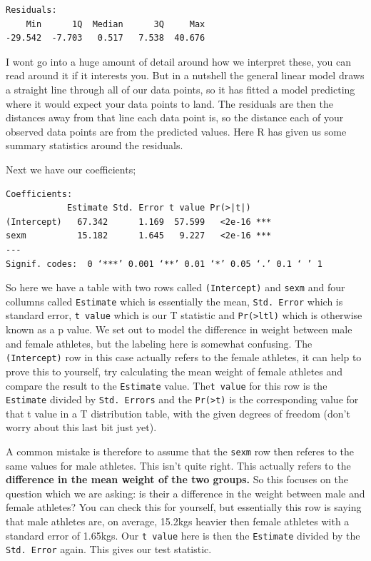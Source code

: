 \documentclass[
]{book}
\begin{document}
\begin{verbatim}
Residuals:
    Min      1Q  Median      3Q     Max 
-29.542  -7.703   0.517   7.538  40.676 
\end{verbatim}

I wont go into a huge amount of detail around how we interpret these, you can read around it if it interests you. But in a nutshell the general linear model draws a straight line through all of our data points, so it has fitted a model predicting where it would expect your data points to land. The residuals are then the distances away from that line each data point is, so the distance each of your observed data points are
from the predicted values. Here R has given us some summary statistics around the residuals.

Next we have our coefficients;

\begin{verbatim}
Coefficients:
            Estimate Std. Error t value Pr(>|t|)    
(Intercept)   67.342      1.169  57.599   <2e-16 ***
sexm          15.182      1.645   9.227   <2e-16 ***
---
Signif. codes:  0 ‘***’ 0.001 ‘**’ 0.01 ‘*’ 0.05 ‘.’ 0.1 ‘ ’ 1
\end{verbatim}

So here we have a table with two rows called \texttt{(Intercept)} and \texttt{sexm} and four collumns called \texttt{Estimate} which is essentially the mean, \texttt{Std.\ Error} which is standard error, \texttt{t\ value} which is our T statistic and \texttt{Pr(\textgreater{}ltl)} which is otherwise known as a p value. We set out to model the difference in weight between male and female athletes, but the labeling here is somewhat confusing. The \texttt{(Intercept)} row in this case actually refers to the female athletes, it can help to prove this to yourself, try calculating the mean weight of female athletes and compare the result to the \texttt{Estimate} value. The\texttt{t\ value} for this row is the \texttt{Estimate} divided by \texttt{Std.\ Errors} and the \texttt{Pr(\textgreater{}\textbar{}t\textbar{})} is the corresponding value for that t value in a T distribution table, with the given degrees of freedom (don't worry about this last bit just yet).

A common mistake is therefore to assume that the \texttt{sexm} row then referes to the same values for male athletes. This isn't quite right. This actually refers to the \textbf{difference in the mean weight of the two groups.} So this focuses on the question which we are asking: is their a difference in the weight between male and female athletes? You can check this for yourself, but essentially this row is saying that male athletes are, on average, 15.2kgs heavier then female athletes with a standard error of 1.65kgs. Our \texttt{t\ value} here is then the \texttt{Estimate} divided by the \texttt{Std.\ Error} again. This gives our test statistic.
\end{document}
